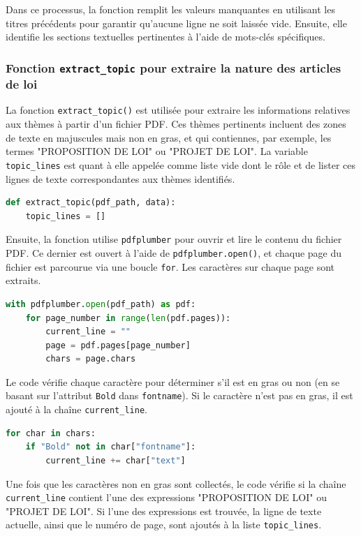 Dans ce processus, la fonction remplit les valeurs manquantes en utilisant les titres précédents pour garantir qu'aucune ligne ne soit laissée vide. Ensuite, elle identifie les sections textuelles pertinentes à l'aide de mots-clés spécifiques.

\subsubsection{Fonction \texttt{extract\_topic} pour extraire la nature des articles de loi}

La fonction \texttt{extract\_topic()} est utilisée pour extraire les informations relatives aux thèmes à partir d’un fichier \gls{PDF}. Ces thèmes pertinents incluent des zones de texte en majuscules mais non en gras, et qui contiennes, par exemple, les termes "PROPOSITION DE LOI" ou "PROJET DE LOI". La variable \texttt{topic\_lines} est quant à elle appelée comme liste vide dont le rôle et de lister ces lignes de texte correspondantes aux thèmes identifiés.

\begin{lstlisting}[language=Python]
def extract_topic(pdf_path, data):
    topic_lines = []
\end{lstlisting}

Ensuite, la fonction utilise \texttt{\gls{pdfplumber}} pour ouvrir et lire le contenu du fichier \gls{PDF}. Ce dernier est ouvert à l'aide de \texttt{pdfplumber.open()}, et chaque page du fichier est parcourue via une boucle \texttt{for}. Les caractères sur chaque page sont extraits.

\begin{lstlisting}[language=Python]
with pdfplumber.open(pdf_path) as pdf:
    for page_number in range(len(pdf.pages)):
        current_line = ""
        page = pdf.pages[page_number]
        chars = page.chars
\end{lstlisting}

Le code vérifie chaque caractère pour déterminer s'il est en gras ou non (en se basant sur l'attribut \texttt{Bold} dans \texttt{fontname}). Si le caractère n'est pas en gras, il est ajouté à la chaîne \texttt{current\_line}.

\begin{lstlisting}[language=Python]
for char in chars:
    if "Bold" not in char["fontname"]:
        current_line += char["text"]
\end{lstlisting}

Une fois que les caractères non en gras sont collectés, le code vérifie si la chaîne \texttt{current\_line} contient l'une des expressions "PROPOSITION DE LOI" ou "PROJET DE LOI". Si l'une des expressions est trouvée, la ligne de texte actuelle, ainsi que le numéro de page, sont ajoutés à la liste \texttt{topic\_lines}.

